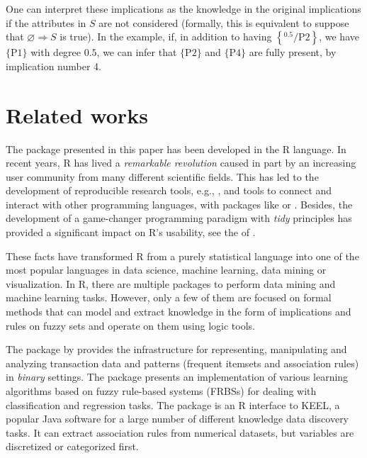 One can interpret these implications as the knowledge in the original
implications if the attributes in \(S\) are not considered (formally,
this is equivalent to suppose that \(\varnothing\Rightarrow S\) is
true). In the example, if, in addition to having
\ensuremath{\left\{{^{0.5}}\!/\mathrm{P2}\right\}}, we have
\(\{\mathrm{P1}\}\) with degree \(0.5\), we can infer that
\(\{\mathrm{P2}\}\) and \(\{\mathrm{P4}\}\) are fully present, by
implication number 4.

\hypertarget{related}{%
\section{Related works}\label{related}}

The package presented in this paper has been developed in the R
language. In recent years, R has lived a \emph{remarkable revolution}
caused in part by an increasing user community from many different
scientific fields. This has led to the development of reproducible
research tools, e.g.,  \citep{rmarkdown}, and tools
to connect and interact with other programming languages, with packages
like  \citep{rcpp} or 
\citep{reticulate}. Besides, the development of a game-changer
programming paradigm with \emph{tidy} principles  has provided a significant
impact on R's usability, see the
 of \citet{tidyverse}.

These facts have transformed R from a purely statistical language into
one of the most popular languages in data science, machine learning,
data mining or visualization. In R, there are multiple packages to
perform data mining and machine learning tasks. However, only a few of
them are focused on formal methods that can model and extract knowledge
in the form of implications and rules on fuzzy sets and operate on them
using logic tools.

The  package by \citet{Hashler} provides the
infrastructure for representing, manipulating and analyzing transaction
data and patterns (frequent itemsets and association rules) in
\emph{binary} settings. The  package \citep{frbs} presents
an implementation of various learning algorithms based on fuzzy
rule-based systems (FRBSs) for dealing with classification and
regression tasks. The  package \citep{rkeel} is an R
interface to KEEL, a popular Java software for a large number of
different knowledge data discovery tasks. It can extract association
rules from numerical datasets, but variables are discretized or
categorized first.

